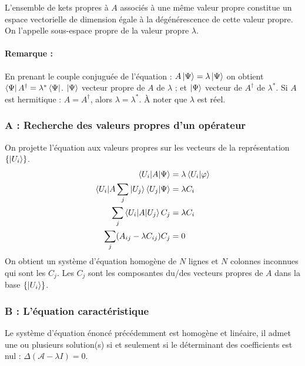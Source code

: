 \documentclass[12pt,a4paper,titlepage]{book}
\begin{document}
L'ensemble de kets propres à $A$ associés à une même valeur propre constitue un espace vectorielle de dimension égale à la dégénérescence de cette valeur propre. On l'appelle sous-espace propre de la valeur propre $\lambda$.

\paragraph*{Remarque :}
En prenant le couple conjuguée de l'équation : $A \ket{\Psi} = \lambda \ket{\Psi}$ on obtient $\bra{\Psi} A^{\dagger} = \lambda^* \bra{\Psi}$. $\ket{\Psi}$ vecteur propre de $A$ de $\lambda$ ; et $\ket{\Psi}$ vecteur de $A^{\dagger}$ de $\lambda^*$. Si $A$ est hermitique : $A = A^{\dagger}$, alors $\lambda = \lambda^*$. À noter que $\lambda$ est réel.

\subsubsection{A : Recherche des valeurs propres d'un opérateur}

On projette l'équation aux valeurs propres sur les vecteurs de la représentation $\left\lbrace \ket{U_i} \right\rbrace$.
\begin{align*}
\braket{U_i | A | \Psi} &= \lambda \braket{U_i | \varphi}\\
\braket{U_i | A \sum\limits_j | U_j} \braket{U_j | \Psi} &= \lambda C_i\\
\sum\limits_j \braket{U_i | A | U_j} C_j &= \lambda C_i\\
\sum\limits_j (A_{ij} - \lambda C_{ij}) C_j &= 0
\end{align*}
On obtient un système d'équation homogène de $N$ lignes et $N$ colonnes inconnues qui sont les $C_j$. Les $C_j$ sont les composantes du/des vecteurs propres de $A$ dans la base $\left\lbrace \ket{U_i} \right\rbrace$.

\subsubsection{B : L'équation caractéristique}
Le système d'équation énoncé précédemment est homogène et linéaire, il admet une ou plusieurs solution(s) si et seulement si le déterminant des coefficients est nul : $\Delta (\mathcal{A} - \lambda I) = 0$.\\
\end{document}
